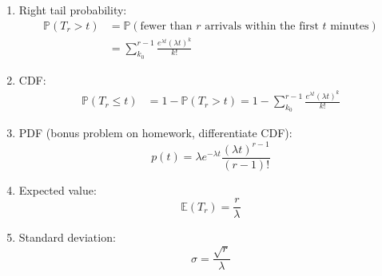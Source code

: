 \documentclass[titlepage, 12pt, leqno]{article}
\begin{document}
\begin{enumerate}
    \item Right tail probability:
          \begin{align*}
            \mathbb{P}(T_r > t)&= \mathbb{P}( \text{fewer than $r$ arrivals within
            the first $t$ minutes}) \\
                               &= \sum_{k_0}^{r-1}\frac{e^{\lambda t}
                               (\lambda t)^k}{k!}
          \end{align*}
    \item CDF:
       \begin{align*}
           \mathbb{P}(T_r\le t) &= 1-\mathbb{P}(T_r>t) = 1 - \sum_{k_0}^
           {r-1}\frac{e^{\lambda t}(\lambda t)^k}{k!}
       \end{align*}
    \item PDF (bonus problem on homework, differentiate CDF): 
        \[
            p(t) = \lambda e^{-\lambda t}\frac{(\lambda t)^{r-1}}{(r-1)!}
        \]
    \item Expected value: 
        \[
            \mathbb{E}(T_r) = \frac{r}{\lambda}
        \]
    \item  Standard deviation:
        \[
            \sigma = \frac{\sqrt{r}}{\lambda}
        \]
\end{enumerate}
\end{document}
